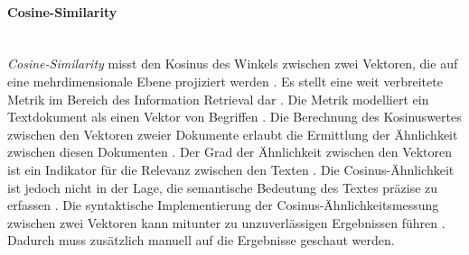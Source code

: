 \paragraph{Cosine-Similarity}\mbox{}\\
\emph{Cosine-Similarity} misst den Kosinus des Winkels zwischen zwei Vektoren, die auf eine mehrdimensionale Ebene projiziert werden \cite{sitikhu2019comparison}. Es stellt eine weit verbreitete Metrik im Bereich des Information Retrieval dar \cite{rahutomo2012semantic}. Die Metrik modelliert ein Textdokument als einen Vektor von Begriffen \cite{rahutomo2012semantic}. Die Berechnung des Kosinuswertes zwischen den Vektoren zweier Dokumente erlaubt die Ermittlung der Ähnlichkeit zwischen diesen Dokumenten \cite{rahutomo2012semantic}. Der Grad der Ähnlichkeit zwischen den Vektoren ist ein Indikator für die Relevanz zwischen den Texten \cite{rahutomo2012semantic}. Die Cosinus-Ähnlichkeit ist jedoch nicht in der Lage, die semantische Bedeutung des Textes präzise zu erfassen \cite{rahutomo2012semantic}. Die syntaktische Implementierung der Cosinus-Ähnlichkeitsmessung zwischen zwei Vektoren kann mitunter zu unzuverlässigen Ergebnissen führen \cite{rahutomo2012semantic}. Dadurch muss zusätzlich manuell auf die Ergebnisse geschaut werden.
